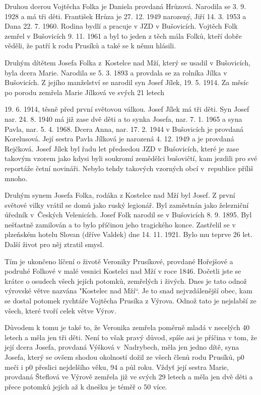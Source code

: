 \documentclass[../dejiny-rodu-prusiku.tex]{subfiles}
\begin{document}
Druhou dcerou Vojtěcha Folka je Daniela provdaná Hrůzová. Narodila se 3. 9. 1928 a má tři děti. František Hrůza je 27. 12. 1949 narozený, Jiří 14. 3. 1953 a Dana 22. 7. 1960. Rodina bydlí a pracuje v JZD v Bušovicích. Vojtěch Folk zemřel v Bušovicích 9. 11. 1961 a byl to jeden z těch mála Folků, kteří dobře věděli, že patří k rodu Prusíků a také se k němu hlásili.

Druhým dítětem Josefa Folka z Kostelce nad Mží, který se usadil v Bušovicích, byla dcera Marie. Narodila se 5. 3. 1893 a provdala se za rolníka Jílka v Bušovicích. Z jejího manželství se narodil syn Josef Jílek, 19. 5. 1914. Za měsíc po porodu zemřela Marie Jílková ve svých 21 letech

19. 6. 1914, těsně před první světovou válkou. Josef Jílek má tři děti. Syn Josef nar. 24. 8. 1940 má již zase dvě děti a to synka Josefa, nar. 7. 1. 1965 a syna Pavla, nar. 5. 4. 1968. Dcera Anna, nar. 17. 2. 1944 v Bušovicích je provdaná Korelusová. Její sestra Pavla Jílková je narozená 4. 12. 1949 a je provdaná Rejčková. Josef Jílek byl řadu let předsedou JZD v Bušovicích, které je zase takovým vzorem jako kdysi byli soukromí zemědělci bušovičtí, kam jezdili pro své reportáže četní novináři. Nebylo tehdy takových vzorných obcí v republice příliš mnoho.

Druhým synem Josefa Folka, rodáka z Kostelce nad Mží byl Josef. Z první světové vilky vrátil se domů jako ruský legionář. Byl zaměstnán jako železniční úředník v Českých Velenicích. Josef Folk narodil se v Bušovicích 8. 9. 1895. Byl nešťastně zamilován a to bylo příčinou jeho tragického konce. Zastřelil se v plzeňském hotelu Slovan (dříve Valdek) dne 14. 11. 1921. Bylo mu teprve 26 let. Další život pro něj ztratil smysl.

Tím je ukončeno líčení o životě Veroniky Prusíkové, provdané Hořejšové a podruhé Folkové v malé vesnici Kostelci nad Mží v roce 1846. Dočetli jste se krátce o osudech všech jejích potomků, zemřelých i živých. Dnes je tato odnož výrovské větve nazvána "Kostelec nad Mží“. Je to snad nejvzdálenější obec, kam se dostal potomek rychtáře Vojtěcha Prusíka z Výrova. Odnož tato je nejslabší ze všech, které tvoří celek větve Výrov.

Důvodem k tomu je také to, že Veronika zemřela poměrně mladá v necelých 40 letech a měla jen tři děti. Není to však pravý důvod, spíše asi je příčina v tom, že její dcera Josefa, provdaná Výšková v Nadrybech, měla jen jedno dítě, syna Josefa, který se ovšem shodou okolností dožil ze všech členů rodu Prusíků, p0 meči i p0 přeslici nejdelšího věku, 94 a půl  roku. Vždyť její sestra Marie, provdaná Šteflová ve Výrově zemřela již ve svých 29 letech a měla jen dvě děti a přece potomků jejích až k dnešku je téměř o 50 více.
\end{document}
